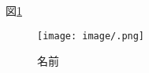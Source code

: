 図\ref{label}

\begin{figure}[htbp]
\centering%
\texttt{[image: image/.png]}
\caption{名前\cite{name} } %
\label{label} %
\end{figure}


\newpage